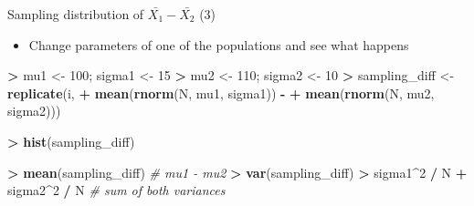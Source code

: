 \documentclass[
  ignorenonframetext,
]{beamer}
\newenvironment{Shaded}{\begin{snugshade}}{\end{snugshade}}
\newcommand{\CommentTok}[1]{\textcolor[rgb]{0.56,0.35,0.01}{\textit{#1}}}
\newcommand{\DecValTok}[1]{\textcolor[rgb]{0.00,0.00,0.81}{#1}}
\newcommand{\FunctionTok}[1]{\textcolor[rgb]{0.13,0.29,0.53}{\textbf{#1}}}
\newcommand{\NormalTok}[1]{#1}
\newcommand{\OtherTok}[1]{\textcolor[rgb]{0.56,0.35,0.01}{#1}}
\newcommand{\SpecialCharTok}[1]{\textcolor[rgb]{0.81,0.36,0.00}{\textbf{#1}}}
\providecommand{\tightlist}{%
  \setlength{\itemsep}{0pt}\setlength{\parskip}{0pt}}
\begin{document}
\begin{frame}[fragile]{Sampling distribution of
\(\bar{X_1} - \bar{X_2}\) (3)}
\label{sampling-distribution-of-barx_1---barx_2-3}
\begin{itemize}
\tightlist
\item
  Change parameters of one of the populations and see what happens
\end{itemize}

\begin{Shaded}
\begin{Highlighting}[]
\SpecialCharTok{\textgreater{}}\NormalTok{ mu1 }\OtherTok{\textless{}{-}} \DecValTok{100}\NormalTok{; sigma1 }\OtherTok{\textless{}{-}} \DecValTok{15}
\SpecialCharTok{\textgreater{}}\NormalTok{ mu2 }\OtherTok{\textless{}{-}} \DecValTok{110}\NormalTok{; sigma2 }\OtherTok{\textless{}{-}} \DecValTok{10}
\SpecialCharTok{\textgreater{}}\NormalTok{ sampling\_diff }\OtherTok{\textless{}{-}} \FunctionTok{replicate}\NormalTok{(i,}
\SpecialCharTok{+}                            \FunctionTok{mean}\NormalTok{(}\FunctionTok{rnorm}\NormalTok{(N, mu1, sigma1)) }\SpecialCharTok{{-}}
\SpecialCharTok{+}                            \FunctionTok{mean}\NormalTok{(}\FunctionTok{rnorm}\NormalTok{(N, mu2, sigma2)))}
\end{Highlighting}
\end{Shaded}

\begin{Shaded}
\begin{Highlighting}[]
\SpecialCharTok{\textgreater{}} \FunctionTok{hist}\NormalTok{(sampling\_diff)}
\end{Highlighting}
\end{Shaded}

\begin{Shaded}
\begin{Highlighting}[]
\SpecialCharTok{\textgreater{}} \FunctionTok{mean}\NormalTok{(sampling\_diff) }\CommentTok{\# mu1 {-} mu2}
\SpecialCharTok{\textgreater{}} \FunctionTok{var}\NormalTok{(sampling\_diff)}
\SpecialCharTok{\textgreater{}}\NormalTok{ sigma1}\SpecialCharTok{\^{}}\DecValTok{2} \SpecialCharTok{/}\NormalTok{ N }\SpecialCharTok{+}\NormalTok{ sigma2}\SpecialCharTok{\^{}}\DecValTok{2} \SpecialCharTok{/}\NormalTok{ N }\CommentTok{\# sum of both variances}
\end{Highlighting}
\end{Shaded}
\end{frame}
\end{document}
